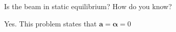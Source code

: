 Is the beam in static equilibrium? How do you know?

\begin{solution}
    Yes. This problem states that $\boldsymbol{a} = \boldsymbol{\alpha} = 0$
\end{solution}